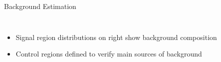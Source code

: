 \documentclass[aspectratio=169,xcolor=table]{beamer}
\begin{document}
  \begin{frame}[t]{Background Estimation}
    \begin{columns}
        \begin{itemize}
          \item Signal region \Etm distributions on right show background composition
          \item Control regions defined to verify main sources of background
        \end{itemize}
    \begin{table}[!thp]
    \end{table}



\end{columns}
\end{frame}
\end{document}
